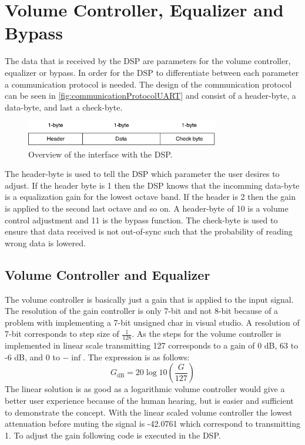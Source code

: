 \section{Volume Controller, Equalizer and Bypass}

The data that is received by the DSP are parameters for the volume controller, equalizer or bypass. In order for the DSP to differentiate between each parameter a communication protocol is needed. The design of the communication protocol can be seen in \autoref{fig:communicationProtocolUART} and consist of a header-byte, a data-byte, and last a check-byte. 
\begin{figure}[H]
\centering
\includegraphics[width=0.75\textwidth]{figures/communicationProtocolUART.pdf}
\caption{Overview of the interface with the DSP.}
\label{fig:communicationProtocolUART}
\end{figure}
The header-byte is used to tell the DSP which parameter the user desires to adjust. If the header byte is 1 then the DSP knows that the incomming data-byte is a equalization gain for the lowest octave band. If the header is 2 then the gain is applied to the second last octave and so on. A header-byte of 10 is a volume control adjustment and 11 is the bypass function. The check-byte is used to ensure that data received is not out-of-sync such that the probability of reading wrong data is lowered.

\subsection*{Volume Controller and Equalizer}
The volume controller is basically just a gain that is applied to the input signal. The resolution of the gain controller is only 7-bit and not 8-bit because of a problem with implementing a 7-bit unsigned char in visual studio. A resolution of 7-bit corresponds to step size of $\frac{1}{128}$. As the steps for the volume controller is implemented in linear scale transmitting 127 corresponds to a gain of 0 dB, 63 to -6 dB, and 0 to $-\inf$. The expression is as follows:
\begin{equation}
G_{\text{dB}} = 20 \log 10 \left( \frac{G}{127} \right)
\end{equation}
The linear solution is as good as a logarithmic volume controller would give a better user experience because of the human hearing, but is easier and sufficient to demonstrate the concept. With the linear scaled volume controller the lowest attenuation before muting the signal is -42.0761 which correspond to transmitting 1. To adjust the gain following code is executed in the DSP.

